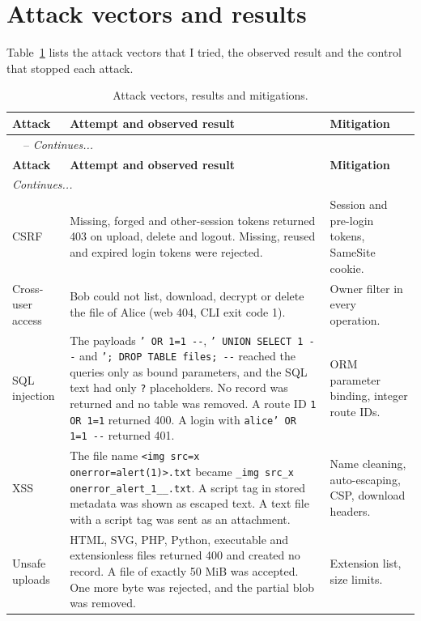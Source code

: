 \section{Attack vectors and results}

Table~\ref{tab:attacks} lists the attack vectors that I tried, the observed result and the control that stopped each attack.

\begin{longtable}[hp]{|p{2.7cm}|p{7.5cm}|p{3.0cm}|}
	\caption{Attack vectors, results and mitigations.}
	\label{tab:attacks}\\ \hline
	\textbf{Attack} & \textbf{Attempt and observed result} & \textbf{Mitigation} \\
	\hline
	\endfirsthead
	\multicolumn{3}{l}{\tablename\ \thetable\ -- \textit{Continues...}} \\
	\hline
	\textbf{Attack} & \textbf{Attempt and observed result} & \textbf{Mitigation} \\
	\hline
	\endhead
	\hline \multicolumn{3}{l}{\textit{Continues...}} \\
	\endfoot
	\hline
	\endlastfoot
	CSRF & Missing, forged and other-session tokens returned 403 on upload, delete and logout. Missing, reused and expired login tokens were rejected. & Session and pre-login tokens, SameSite cookie. \\ \hline
	Cross-user access & Bob could not list, download, decrypt or delete the file of Alice (web 404, CLI exit code 1). & Owner filter in every operation. \\ \hline
	SQL injection & The payloads \texttt{' OR 1=1 -{}-}, \texttt{' UNION SELECT 1 -{}-} and \texttt{'; DROP TABLE files; -{}-} reached the queries only as bound parameters, and the SQL text had only \texttt{?} placeholders. No record was returned and no table was removed. A route ID \texttt{1 OR 1=1} returned 400. A login with \texttt{alice' OR 1=1 -{}-} returned 401. & ORM parameter binding, integer route IDs. \\ \hline
	XSS & The file name \texttt{<img src=x onerror=alert(1)>.txt} became \texttt{\_img src\_x onerror\_alert\_1\_\_.txt}. A script tag in stored metadata was shown as escaped text. A text file with a script tag was sent as an attachment. & Name cleaning, auto-escaping, CSP, download headers. \\ \hline
	Unsafe uploads & HTML, SVG, PHP, Python, executable and extensionless files returned 400 and created no record. A file of exactly 50 MiB was accepted. One more byte was rejected, and the partial blob was removed. & Extension list, size limits. \\ \hline

\end{longtable}
